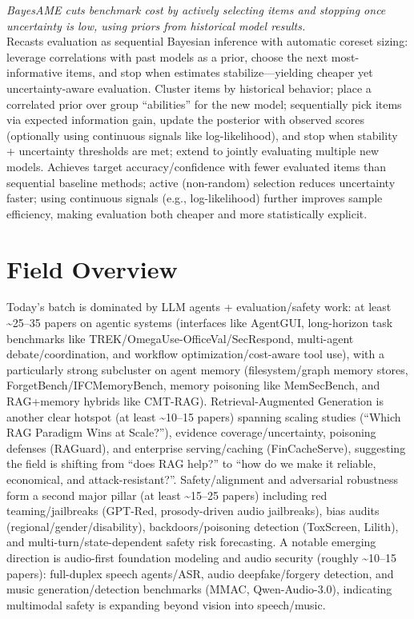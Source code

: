 \documentclass[12pt,letterpaper]{article}
\begin{document}
{\small\textit{BayesAME cuts benchmark cost by actively selecting items and stopping once uncertainty is low, using priors from historical model results.}}\\[1pt]
{\footnotesize Recasts evaluation as sequential Bayesian inference with automatic coreset sizing: leverage correlations with past models as a prior, choose the next most-informative items, and stop when estimates stabilize---yielding cheaper yet uncertainty-aware evaluation. Cluster items by historical behavior; place a correlated prior over group ``abilities'' for the new model; sequentially pick items via expected information gain, update the posterior with observed scores (optionally using continuous signals like log-likelihood), and stop when stability + uncertainty thresholds are met; extend to jointly evaluating multiple new models. Achieves target accuracy/confidence with fewer evaluated items than sequential baseline methods; active (non-random) selection reduces uncertainty faster; using continuous signals (e.g., log-likelihood) further improves sample efficiency, making evaluation both cheaper and more statistically explicit.}

\medskip



\section*{Field Overview}
{\footnotesize Today's batch is dominated by LLM agents + evaluation/safety work: at least \textasciitilde{}25--35 papers on agentic systems (interfaces like AgentGUI, long-horizon task benchmarks like TREK/OmegaUse-OfficeVal/SecRespond, multi-agent debate/coordination, and workflow optimization/cost-aware tool use), with a particularly strong subcluster on agent memory (filesystem/graph memory stores, ForgetBench/IFCMemoryBench, memory poisoning like MemSecBench, and RAG+memory hybrids like CMT-RAG). Retrieval-Augmented Generation is another clear hotspot (at least \textasciitilde{}10--15 papers) spanning scaling studies (``Which RAG Paradigm Wins at Scale?''), evidence coverage/uncertainty, poisoning defenses (RAGuard), and enterprise serving/caching (FinCacheServe), suggesting the field is shifting from ``does RAG help?'' to ``how do we make it reliable, economical, and attack-resistant?''. Safety/alignment and adversarial robustness form a second major pillar (at least \textasciitilde{}15--25 papers) including red teaming/jailbreaks (GPT-Red, prosody-driven audio jailbreaks), bias audits (regional/gender/disability), backdoors/poisoning detection (ToxScreen, Lilith), and multi-turn/state-dependent safety risk forecasting. A notable emerging direction is audio-first foundation modeling and audio security (roughly \textasciitilde{}10--15 papers): full-duplex speech agents/ASR, audio deepfake/forgery detection, and music generation/detection benchmarks (MMAC, Qwen-Audio-3.0), indicating multimodal safety is expanding beyond vision into speech/music.}
\end{document}
